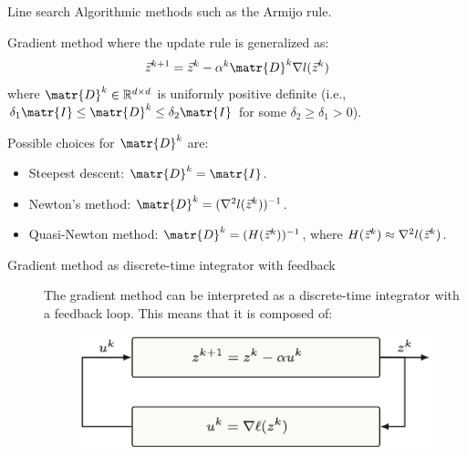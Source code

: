 \begin{description}
\begin{remark}
\begin{descriptionlist}
                \item[Line search] 
                    Algorithmic methods such as the Armijo rule.
            \end{descriptionlist}
        \end{remark}

    \item[Generalized gradient method] 
        Gradient method where the update rule is generalized as:
        \[ \z^{k+1} = \z^k - \alpha^k \matr{D}^k \nabla l(\z^k) \]
        where $\matr{D}^k \in \mathbb{R}^{d \times d}$ is uniformly positive definite (i.e., $\delta_1 \matr{I} \leq \matr{D}^k \leq \delta_2 \matr{I}$ for some $\delta_2 \geq \delta_1 > 0$).

        Possible choices for $\matr{D}^k$ are:
        \begin{itemize}
            \item Steepest descent: $\matr{D}^k = \matr{I}$.
            \item Newton's method: $\matr{D}^k = (\nabla^2 l(\z^k))^{-1}$.
            \item Quasi-Newton method: $\matr{D}^k = (H(\z^k))^{-1}$, where $H({\vec{z}}^k) \approx \nabla^2 l({\vec{z}}^k)$.
        \end{itemize}
\end{description}

\begin{description}
    \item[Gradient method as discrete-time integrator with feedback] 
        The gradient method can be interpreted as a discrete-time integrator with a feedback loop. This means that it is composed of:

        \begin{figure}[H]
            \centering
            \includegraphics[width=0.55\linewidth]{./img/_gradient_method_integrator.pdf}
        \end{figure}
\end{description} 

